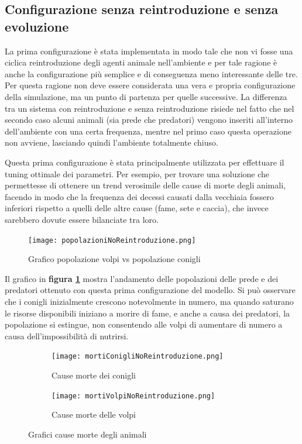 \documentclass[11pt]{article}
\begin{document}
\subsection{Configurazione senza reintroduzione e senza evoluzione}
La prima configurazione è stata implementata in modo tale che non vi fosse una ciclica reintroduzione degli agenti animale nell'ambiente e per tale ragione è anche la configurazione più semplice e di conseguenza meno interessante delle tre. Per questa ragione non deve essere considerata una vera e propria configurazione della simulazione, ma un punto di partenza per quelle successive. 
La differenza tra un sistema con reintroduzione e senza reintroduzione risiede nel fatto che nel secondo caso alcuni animali (sia prede che predatori) vengono inseriti all'interno dell'ambiente con una certa frequenza, mentre nel primo caso questa operazione non avviene, lasciando quindi l'ambiente totalmente chiuso.

Questa prima configurazione è stata principalmente utilizzata per effettuare il tuning ottimale dei parametri. Per esempio, per trovare una soluzione che permettesse di ottenere un trend verosimile delle cause di morte degli animali, facendo in modo che la frequenza dei decessi causati dalla vecchiaia fossero inferiori rispetto a quelli delle altre cause (fame, sete e caccia), che invece sarebbero dovute essere bilanciate tra loro.   


\begin{figure}[h!]
     \centering
     \texttt{[image: popolazioniNoReintroduzione.png]}
     \caption{Grafico popolazione volpi vs popolazione conigli}
     \label{fig:coniglioVolpeNoReintroduzione}
\end{figure}

Il grafico in \textbf{figura \ref{fig:coniglioVolpeNoReintroduzione}} mostra l'andamento delle popolazioni delle prede e dei predatori ottenuto con questa prima configurazione del modello. Si può osservare che i conigli inizialmente crescono notevolmente in numero, ma quando saturano le risorse disponibili iniziano a morire di fame, e anche a causa dei predatori, la popolazione si estingue, non consentendo alle volpi di aumentare di numero a causa dell'impossibilità di nutrirsi. 


\begin{figure}[h!]
	\begin{subfigure}{\textwidth}
            \centering
            \texttt{[image: mortiConigliNoReintroduzione.png]}
            \caption{Cause morte dei conigli}
            \label{fig:morteConigliNoReintroduzione}
	\end{subfigure}
		\begin{subfigure}{\textwidth}
		\centering
        \texttt{[image: mortiVolpiNoReintroduzione.png]}
        \caption{Cause morte delle volpi}
        \label{fig:morteVolpeNoReintroduzione}
	\end{subfigure}
\caption{Grafici cause morte degli animali}
\end{figure}
\end{document}
